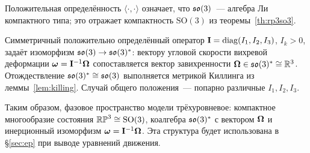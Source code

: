 Положительная определённость $\langle\cdot,\cdot\rangle$ означает, что
$\mathfrak{so}(3)$~--- алгебра Ли компактного типа; это отражает компактность
$\mathrm{SO}(3)$ из теоремы~\ref{th:rp3so3}.

\begin{definition}\label{def:inertia}
Симметричный положительно определённый оператор
$\mathbf{I} = \operatorname{diag}(I_1, I_2, I_3)$, $I_k > 0$, задаёт изоморфизм
$\mathfrak{so}(3) \to \mathfrak{so}(3)^{*}$: вектору угловой скорости вихревой деформации
$\boldsymbol{\omega} = \mathbf{I}^{-1}\boldsymbol{\Omega}$ сопоставляется вектор завихренности
$\boldsymbol{\Omega} \in \mathfrak{so}(3)^{*} \cong \mathbb{R}^3$. Отождествление $\mathfrak{so}(3)^{*} \cong \mathfrak{so}(3)$
выполняется метрикой Киллинга из леммы~\ref{lem:killing}.
Случай общего положения~--- попарно различные $I_1, I_2, I_3$.
\end{definition}

Таким образом, фазовое пространство модели трёхуровневое: компактное
многообразие состояния $\mathbb{RP}^3 \cong \mathrm{SO}(3)$, коалгебра
$\mathfrak{so}(3)^{*}$ с вектором $\boldsymbol{\Omega}$ и инерционный изоморфизм $\boldsymbol{\omega} = \mathbf{I}^{-1}\boldsymbol{\Omega}$.
Эта структура будет использована в \S\ref{sec:ep} при выводе уравнений
движения.
